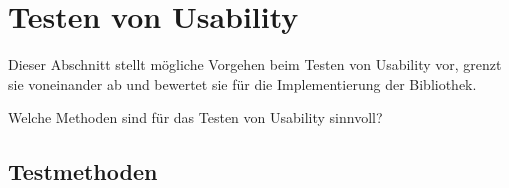\section{Testen von Usability}
\label{usability_testing}

Dieser Abschnitt stellt mögliche Vorgehen beim Testen von Usability vor, grenzt sie voneinander ab und bewertet sie für die Implementierung der Bibliothek. 

Welche Methoden sind für das Testen von Usability sinnvoll?

\subsection{Testmethoden}

\subsection{}


\cite{usabilityblog_wasBeachten}

\cite{usabilityblog_eResult}